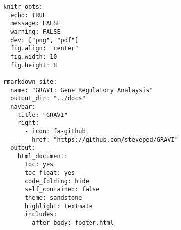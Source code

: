 \documentclass[
]{book}
\begin{document}
\begin{verbatim}
knitr_opts:
  echo: TRUE
  message: FALSE
  warning: FALSE
  dev: ["png", "pdf"]
  fig.align: "center"
  fig.width: 10
  fig.height: 8

rmarkdown_site:
  name: "GRAVI: Gene Regulatory Analaysis"
  output_dir: "../docs"
  navbar:
    title: "GRAVI"
    right:
      - icon: fa-github
        href: "https://github.com/steveped/GRAVI"
  output:
    html_document:
      toc: yes
      toc_float: yes
      code_folding: hide
      self_contained: false
      theme: sandstone
      highlight: textmate
      includes:
        after_body: footer.html
\end{verbatim}

  
\end{document}
